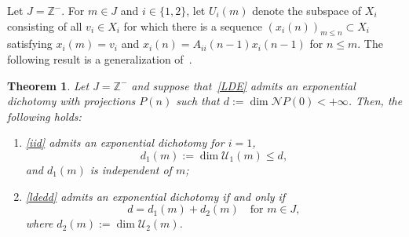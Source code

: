 \documentclass[11pt,reqno,a4paper]{amsart}
\theoremstyle{plain}
\numberwithin{equation}{section}
\newtheorem{theorem}{Theorem}
\theoremstyle{remark}
\newtheorem{remark}{Remark}
\begin{document}

Let $J=\mathbb Z^-$. For $m\in J$ and $i\in \{1, 2\}$, let $U_i(m)$ denote the subspace of $X_i$ consisting of all $v_i\in X_i$ for which there is a sequence $(x_i(n))_{m\le n}\subset X_i$ satisfying $x_i(m)=v_i$ and $x_i(n)=A_{ii}(n-1)x_i(n-1)$ for $n\le m$. The following result is a generalization of~\cite[Theorem 8]{DP}.
\begin{theorem}\label{517thm}
Let $J=\mathbb Z^-$ and suppose that~\eqref{LDE} admits an exponential dichotomy with projections $P(n)$ such that $d:=\dim \mathcal N P(0)<+\infty$. Then, the following holds:
\begin{enumerate}
    \item  \eqref{iid}  admits an exponential dichotomy for $i=1$,  \[d_1(m):=\dim \mathcal U_1(m)\le d,\]  and $d_1(m)$ is independent of $m$;%
    \item \eqref{ldedd} admits an exponential dichotomy if and only if
    \begin{equation}\label{dddeq2}d=d_1(m)+d_2(m) \quad \text{for $m\in J$},\end{equation} where $d_2(m):=\dim \mathcal U_2(m)$.
    \end{enumerate} 

\end{theorem}
\end{document}
